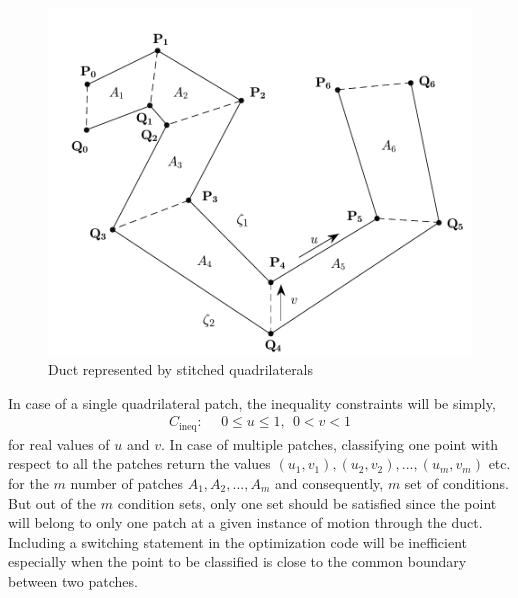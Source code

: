 \documentclass[12pt,a4]{article}
\begin{document}
\begin{figure}[h]
\centering
\includegraphics[scale=0.5]{figures/fig7.pdf}
\caption{Duct represented by stitched quadrilaterals\label{fig:stitchequads}}
\end{figure}

 In case of a single quadrilateral patch, the inequality constraints will be simply,
 \begin{align} \label{eq:minx,u,v}
C_\text{ineq}:~~& 0 \leq u \leq 1 ,~~  0 < v < 1 
\end{align}
for real values of ${u}$ and ${v}$. In case of multiple patches, classifying one point with respect to all the patches return the values $\left({u}_1,{v}_1 \right), \left({u}_2,{v}_2 \right),...,\left({u}_m,{v}_m \right)$ etc. for the $m$ number of patches $A_1, A_2,..., A_m$ and consequently, $m$ set of conditions. But out of the $m$ condition sets, only one set should be satisfied since the point will belong to only one patch at a given instance of motion through the duct. Including a switching  statement in the optimization code will be inefficient especially when the point to be classified is close to the common boundary between two patches. 
\end{document}
